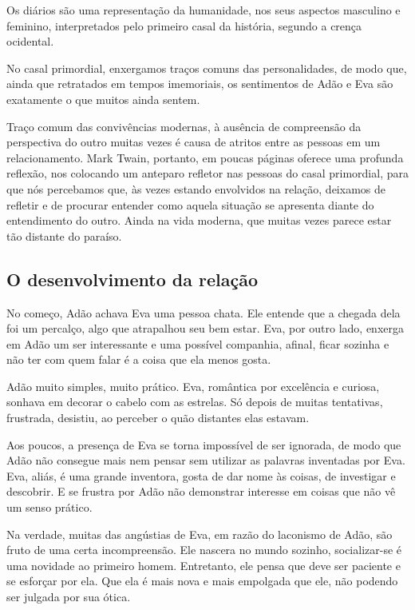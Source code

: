 \documentclass[12pt]{extarticle}
\begin{document}
Os diários são uma representação da humanidade, nos seus aspectos
masculino e feminino, interpretados pelo primeiro casal da história,
segundo a crença ocidental.

No casal primordial, enxergamos traços comuns das personalidades, de
modo que, ainda que retratados em tempos imemoriais, os sentimentos de
Adão e Eva são exatamente o que muitos ainda sentem.

Traço comum das convivências modernas, à ausência de compreensão da
perspectiva do outro muitas vezes é causa de atritos entre as pessoas em
um relacionamento. Mark Twain, portanto, em poucas páginas oferece uma
profunda reflexão, nos colocando um anteparo refletor nas pessoas do
casal primordial, para que nós percebamos que, às vezes estando
envolvidos na relação, deixamos de refletir e de procurar entender como
aquela situação se apresenta diante do entendimento do outro. Ainda na
vida moderna, que muitas vezes parece estar tão distante do paraíso.

\subsection{O desenvolvimento da relação}

No começo, Adão achava Eva uma pessoa chata. Ele entende que a chegada
dela foi um percalço, algo que atrapalhou seu bem estar. Eva, por outro
lado, enxerga em Adão um ser interessante e uma possível companhia,
afinal, ficar sozinha e não ter com quem falar é a coisa que ela menos
gosta.

Adão muito simples, muito prático. Eva, romântica por excelência e
curiosa, sonhava em decorar o cabelo com as estrelas. Só depois de
muitas tentativas, frustrada, desistiu, ao perceber o quão distantes
elas estavam.

Aos poucos, a presença de Eva se torna impossível de ser ignorada, de
modo que Adão não consegue mais nem pensar sem utilizar as palavras
inventadas por Eva. Eva, aliás, é uma grande inventora, gosta de dar
nome às coisas, de investigar e descobrir. E se frustra por Adão não
demonstrar interesse em coisas que não vê um senso prático.

Na verdade, muitas das angústias de Eva, em razão do laconismo de Adão,
são fruto de uma certa incompreensão. Ele nascera no mundo sozinho,
socializar-se é uma novidade ao primeiro homem. Entretanto, ele pensa
que deve ser paciente e se esforçar por ela. Que ela é mais nova e mais
empolgada que ele, não podendo ser julgada por sua ótica.
\end{document}
